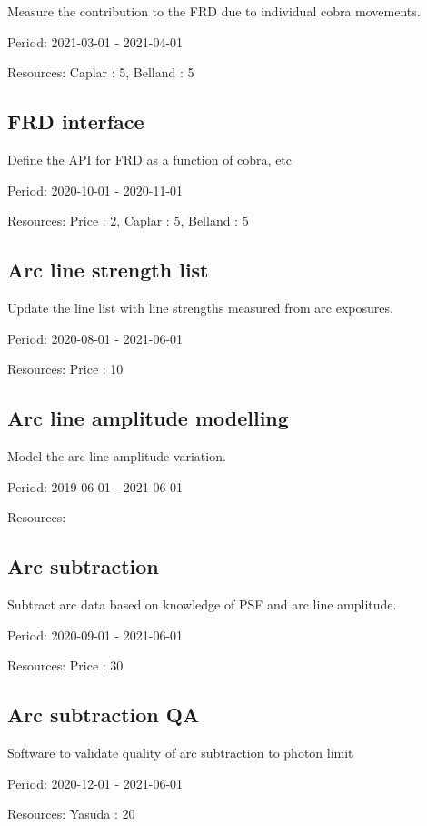 Measure the contribution to the FRD due to individual cobra movements.

Period: 2021-03-01 - 2021-04-01

Resources: Caplar : 5, Belland : 5

\subsection{FRD interface}

Define the API for FRD as a function of cobra, etc

Period: 2020-10-01 - 2020-11-01

Resources: Price : 2, Caplar : 5, Belland : 5

\subsection{Arc line strength list}

Update the line list with line strengths measured from arc exposures.

Period: 2020-08-01 - 2021-06-01

Resources: Price : 10

\subsection{Arc line amplitude modelling}

Model the arc line amplitude variation.

Period: 2019-06-01 - 2021-06-01

Resources: 

\subsection{Arc subtraction}

Subtract arc data based on knowledge of PSF and arc line amplitude.

Period: 2020-09-01 - 2021-06-01

Resources: Price : 30

\subsection{Arc subtraction QA}

Software to validate quality of arc subtraction to photon limit

Period: 2020-12-01 - 2021-06-01

Resources: Yasuda : 20

